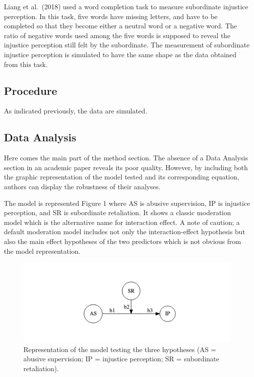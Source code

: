 \documentclass[
]{article}
\begin{document}
Liang et al.~(2018) used a word completion task to measure subordinate
injustice perception. In this task, five words have missing letters, and
have to be completed so that they become either a neutral word or a
negative word. The ratio of negative words used among the five words is
supposed to reveal the injustice perception still felt by the
subordinate. The measurement of subordinate injustice perception is
simulated to have the same shape as the data obtained from this task.

\hypertarget{procedure}{%
\subsection{Procedure}\label{procedure}}

As indicated previously, the data are simulated.

\hypertarget{data-analysis}{%
\subsection{Data Analysis}\label{data-analysis}}

Here comes the main part of the method section. The absence of a Data
Analysis section in an academic paper reveals its poor quality. However,
by including both the graphic representation of the model tested and its
corresponding equation, authors can display the robustness of their
analyses.

The model is represented Figure 1 where AS is abusive supervision, IP is
injustice perception, and SR is subordinate retaliation. It shows a
classic moderation model which is the alternative name for interaction
effect. A note of caution; a default moderation model includes not only
the interaction-effect hypothesis but also the main effect hypotheses of
the two predictors which is not obvious from the model representation.

\begin{figure}
\centering
\includegraphics{voodoo_report_final_files/figure-latex/unnamed-chunk-1-1.png}
\caption{Representation of the model testing the three hypotheses (AS =
abusive supervision; IP = injustice perception; SR = subordinate
retaliation).}
\end{figure}
\end{document}
